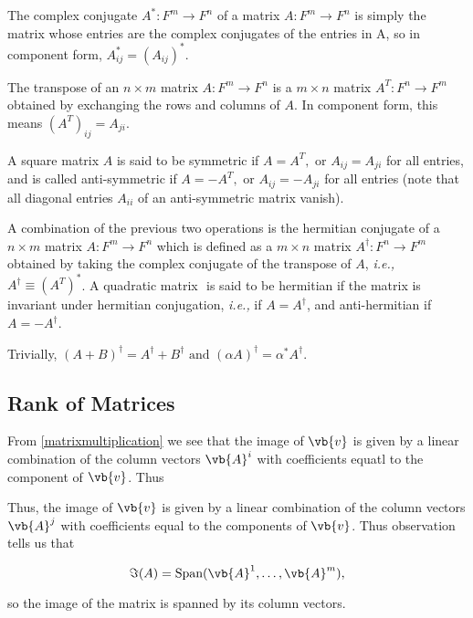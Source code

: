\documentclass[a4paper,12pt]{report}
\begin{document}
The complex conjugate \(A^{*} : F^{m} \rightarrow F^{n}   \) of a matrix \(A: F^{m}\rightarrow F^{n}  \) is simply the matrix whose entries are the complex conjugates of the entries in A, so in component form, \(A^{*}_{ij} = (A_{ij} )^{*}   \).

The transpose of an \(n\times m\) matrix \(A: F^{m} \rightarrow F^{n}   \) is a \(m\times n\) matrix \(A^{T}: F^{n} \rightarrow F^{m}   \) obtained by exchanging the rows and columns of \(A\). In component form, this means \((A^{T} )_{ij} = A_{ji}  \). 

A square matrix \(A\) is said to be symmetric if \(A = A^{T}, \text { or } A_{ij} = A_{ji}   \) for all entries, and is called anti-symmetric if \(A = -A^{T}, \text { or } A_{ij} = -A_{ji}   \) for all entries (note that all diagonal entries \(A_{ii} \) of an anti-symmetric matrix vanish).        

A combination of the previous two operations is the hermitian conjugate of a \(n\times m\) matrix \(A: F^{m} \rightarrow F^{n} \) which is defined as a \(m\times n\) matrix \(A^{\dagger} : F^{n} \rightarrow F^{m}  \) obtained by taking the complex conjugate of the transpose of \(A\), \textit{i.e.,} \(A^{\dagger} \equiv (A^{T} )^{*} \). A quadratic matrix \(\) is said to be hermitian if the matrix is invariant under hermitian conjugation, \textit{i.e.,} if \(A = A^{\dagger} \), and anti-hermitian if \(A = -A^{\dagger} \). 

Trivially, \((A+B)^{\dagger} = A^{\dagger} + B^{\dagger} \text { and } (\alpha A)^{\dagger} = \alpha ^{*} A^{\dagger}\).   

\subsection{Rank of Matrices}

From \cref{matrixmultiplication} we see that the image of \(\vb{v} \) is given by a linear combination of the column vectors \(\vb{A} ^{i}\) with coefficients equatl to the component of \(\vb{v} \). Thus    

Thus, the image of \(\vb{v} \) is given by a linear combination of the column vectors \(\vb{A} ^{j} \) with coefficients equal to the components of \(\vb{v} \). Thus observation tells us that 

\begin{equation}
    \Im (A) = \text{Span}(\vb{A} ^{1} , \ldots , \vb{A} ^{m} ), 
\end{equation}

so the image of the matrix is spanned by its column vectors.
\end{document}
